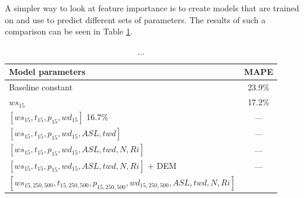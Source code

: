 A simpler way to look at feature importance is to create models that are trained on and use to predict different sets of parameters. The results of such a comparison can be seen in Table \ref{table:setsOfParams}.

\begin{table}[h]
    \caption[Model results for different sets of parameters.]{...}
    \label{table:setsOfParams}
    \centering
    \begin{tabular}{lc}
        \toprule
        \textbf{Model parameters} & \textbf{MAPE}\\ 
        \midrule
        Baseline constant & 23.9\%\\
        $ws_{15}$ & 17.2\%\\
        $[ws_{15}, t_{15}, p_{15}, wd_{15}]$ 16.7\% & ---\\
        $[ws_{15}, t_{15}, p_{15}, wd_{15}, ASL, twd]$ & ---\\
        $[ws_{15}, t_{15}, p_{15}, wd_{15}, ASL, twd, N, Ri]$ & ---\\
        $[ws_{15}, t_{15}, p_{15}, wd_{15}, ASL, twd, N, Ri]$ + DEM & ---\\
        $[ws_{15,250,500}, t_{15,250,500}, p_{15,250,500}, wd_{15,250,500}, ASL, twd, N, Ri]$
        \bottomrule
    \end{tabular}
\end{table}